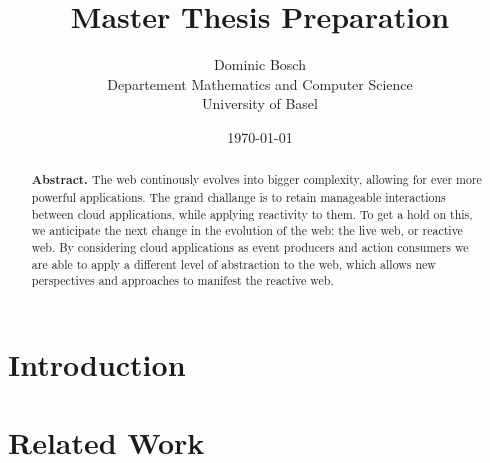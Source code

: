 \documentclass[11pt]{article}%
\begin{document}
\title{Master Thesis Preparation}
\date{\today}
\author{Dominic Bosch \\ Departement Mathematics and Computer Science \\ University of Basel}

\maketitle

\renewcommand{\abstractname}{}
\begin{abstract}
\textbf{Abstract.}
The web continously evolves into bigger complexity, allowing for ever more powerful applications. The grand challange is to retain manageable interactions between cloud applications, while applying reactivity to them. To get a hold on this, we anticipate the next change in the evolution of the web: the live web, or reactive web. By considering cloud applications as event producers and action consumers we are able to apply a different level of abstraction to the web, which allows new perspectives and approaches to manifest the reactive web.
\end{abstract}


\section{Introduction}



\section{Related Work}
\end{document}
